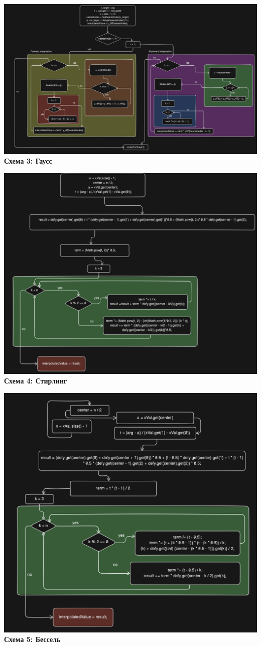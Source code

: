 \documentclass{article}
\begin{document}
\begin{center}
    \includegraphics[width=.9\textwidth]{gauss.png}\\
    \textbf{Схема 3: Гаусс}
\end{center}
\begin{center}
    \includegraphics[width=.9\textwidth]{stirl.png}\\
    \textbf{Схема 4: Стирлинг}
\end{center}
\begin{center}
    \includegraphics[width=.9\textwidth]{bessel.png}\\
    \textbf{Схема 5: Бессель}
\end{center}
\end{document}
